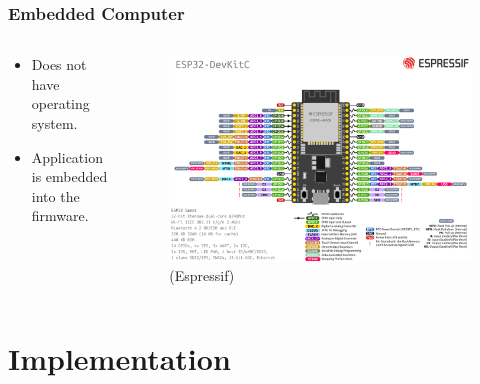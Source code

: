 \documentclass[compress, aspectratio=32]{beamer}
\begin{document}
\begin{frame}
    \frametitle{Embedded Computer}
    \begin{columns}
        \begin{column}[]{0.4\textwidth}
            \begin{itemize}
                \item Does not have operating system.
                \item Application is embedded into the firmware.
            \end{itemize}
        \end{column}
        \begin{column}[]{0.6\textwidth}
            \begin{figure}
                \includegraphics[width=\textwidth]{esp32-devkitC-v4-pinout.png}
                \caption*{(Espressif)}
            \end{figure}
        \end{column}
    \end{columns}
\end{frame}

\section{Implementation}
\end{document}
